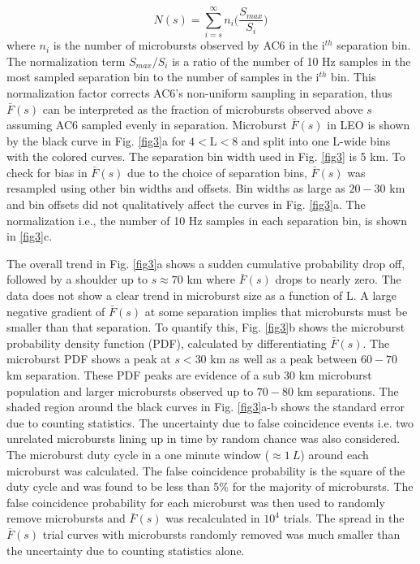 \documentclass[draft]{agujournal2019}
\begin{document}
\begin{equation}
N(s) = \sum_{i = s}^\infty n_{i} \Big( \frac{S_{max}}{S_{i}} \Big)
\end{equation} where $n_{i}$ is the number of microbursts observed by AC6 in the i$^{th}$ separation bin. The normalization term $S_{max}/S_{i}$ is a ratio of the number of 10 Hz samples in the most sampled separation bin to the number of samples in the i$^{th}$ bin. This normalization factor corrects AC6's non-uniform sampling in separation, thus $\bar{F}(s)$ can be interpreted as the fraction of microbursts observed above $s$ assuming AC6 sampled evenly in separation. Microburst $\bar{F}(s)$ in LEO is shown by the black curve in Fig. \ref{fig3}a for $4 < \mathrm{L}< 8$ and split into one L-wide bins with the colored curves. The separation bin width used in Fig. \ref{fig3} is 5 km. To check for bias in $\bar{F}(s)$ due to the choice of separation bins, $\bar{F}(s)$ was resampled using other bin widths and offsets. Bin widths as large as $20-30$ km and bin offsets did not qualitatively affect the curves in Fig. \ref{fig3}a. The normalization i.e., the number of 10 Hz samples in each separation bin, is shown in \ref{fig3}c.

The overall trend in Fig. \ref{fig3}a shows a sudden cumulative probability drop off, followed by a shoulder up to $s \approx 70$ km where $\bar{F}(s)$ drops to nearly zero. The data does not show a clear trend in microburst size as a function of L. A large negative gradient of $\bar{F}(s)$ at some separation implies that microbursts must be smaller than that separation. To quantify this, Fig. \ref{fig3}b shows the microburst probability density function (PDF), calculated by differentiating $\bar{F}(s)$. The microburst PDF shows a peak at $s < 30$ km as well as a peak between $60-70$ km separation. These PDF peaks are evidence of a sub $30$ km microburst population and larger microbursts observed up to $70-80$ km separations. The shaded region around the black curves in Fig. \ref{fig3}a-b shows the standard error due to counting statistics. The uncertainty due to false coincidence events i.e. two unrelated microbursts lining up in time by random chance was also considered. The microburst duty cycle in a one minute window ($\approx 1 \ L$) around each microburst was calculated. The false coincidence probability is the square of the duty cycle and was found to be less than 5\% for the majority of microbursts. The false coincidence probability for each microburst was then used to randomly remove microbursts and $\bar{F}(s)$ was recalculated in $10^4$ trials. The spread in the $\bar{F}(s)$ trial curves with microbursts randomly removed was much smaller than the uncertainty due to counting statistics alone.
\end{document}
